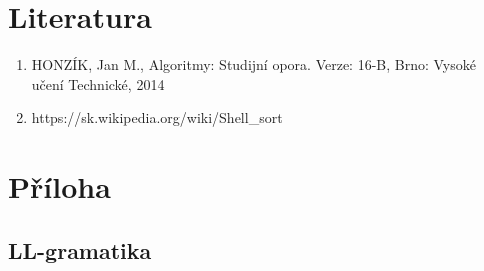 \documentclass[a4paper, 11pt]{article}
\begin{document}
    \section{Literatura}
    \begin{enumerate}
    \item HONZÍK, Jan M., Algoritmy: Studijní opora. Verze: 16-B, Brno: Vysoké učení Technické, 2014
    \item https://sk.wikipedia.org/wiki/Shell\_sort
    \end{enumerate}
    \newpage
    \section{Příloha}
    \subsection{LL-gramatika}
\end{document}
